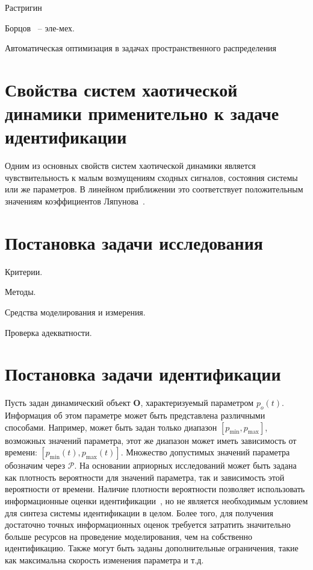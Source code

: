 Растригин~\cite{rastr_stat_meth_search,rastr_seu,rastr_intro,rastr_adop_complex_sys,rastr_rand_search}

Борцов~\cite{borcov} -- эле-мех.

Автоматическая оптимизация в задачах пространственного распределения~\cite{auto_optim_intask}



\section{Свойства систем хаотической динамики применительно к задаче идентификации}  %

Одним из основных свойств систем хаотической динамики является чувствительность
к малым возмущениям сходных сигналов, состояния системы или же параметров.
В линейном приближении это соответствует положительным значениям
коэффициентов Ляпунова~\cite{magni_theory_dyn_chaos,moon_chaotic_vibr}.



\section{Постановка задачи исследования}  %

Критерии.

Методы.

Средства моделирования и измерения.

Проверка адекватности.



\section{Постановка задачи идентификации}  %

Пусть задан динамический объект $ \mathbf{O}$, характеризуемый параметром $p_o(t)$.
Информация об этом параметре может быть представлена
различными способами. Например, может быть задан только диапазон
$[p_{\min}, p_{\max}]$,
возможных значений параметра,
этот же диапазон может иметь зависимость от времени:
$[p_{\min}(t), p_{\max}(t)]$.
Множество допустимых значений параметра обозначим через $\mathcal{P}$.
На основании априорных исследований может
быть задана как плотность вероятности для значений параметра,
так и зависимость этой вероятности от времени. Наличие плотности вероятности
позволяет использовать информационные оценки идентификации~\cite{info_cipkin,atu_asau10},
но не является необходимым условием для синтеза системы идентификации в целом.
Более того, для получения достаточно точных информационных оценок
требуется затратить значительно больше ресурсов на проведение моделирования,
чем на собственно идентификацию.
Также могут быть заданы дополнительные ограничения, такие как максимальна скорость
изменения параметра и т.д.

